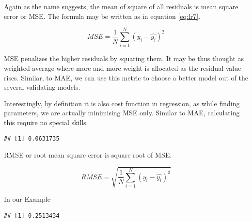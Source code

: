 \documentclass[
]{book}
\newenvironment{Shaded}{\begin{snugshade}}{\end{snugshade}}
\newcommand{\CommentTok}[1]{\textcolor[rgb]{0.56,0.35,0.01}{\textit{#1}}}
\newcommand{\DecValTok}[1]{\textcolor[rgb]{0.00,0.00,0.81}{#1}}
\newcommand{\FunctionTok}[1]{\textcolor[rgb]{0.13,0.29,0.53}{\textbf{#1}}}
\newcommand{\NormalTok}[1]{#1}
\newcommand{\SpecialCharTok}[1]{\textcolor[rgb]{0.81,0.36,0.00}{\textbf{#1}}}
\begin{document}
Again as the name suggests, the mean of square of all residuals is mean square error or MSE. The formula may be written as in equation \eqref{eq:lr7}.

\begin{equation} 
{MSE} = \frac{1}{N}\sum_{i = 1}^{N}({y_i - \hat{y_i}})^2
\label{eq:lr7}
\end{equation}

MSE penalizes the higher residuals by squaring them. It may be thus thought as weighted average where more and more weight is allocated as the residual value rises. Similar, to MAE, we can use this metric to choose a better model out of the several validating models.

Interestingly, by definition it is also cost function in regression, as while finding parameters, we are actually minimising MSE only. Similar to MAE, calculating this require no special skills.

\begin{Shaded}
\end{Shaded}

\begin{verbatim}
## [1] 0.0631735
\end{verbatim}

RMSE or root mean square error is square root of MSE.

\begin{equation} 
{RMSE} = \sqrt{\frac{1}{N}\sum_{i = 1}^{N}({y_i - \hat{y_i}})^2}
\label{eq:lr8}
\end{equation}

In our Example-

\begin{Shaded}
\end{Shaded}

\begin{verbatim}
## [1] 0.2513434
\end{verbatim}
\end{document}
